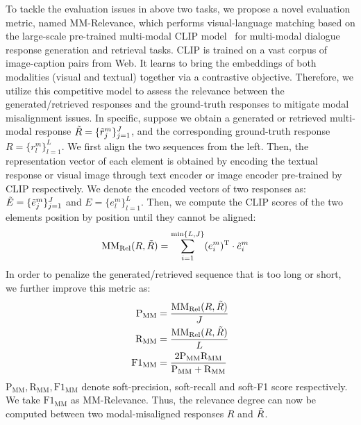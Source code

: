 \documentclass[11pt]{article}
\begin{document}
To tackle the evaluation issues in above two tasks, we propose a novel evaluation metric, named MM-Relevance, which performs visual-language matching based on the large-scale pre-trained multi-modal CLIP model~\cite{radford2021learning} for multi-modal dialogue response generation and retrieval tasks. CLIP is trained on a vast corpus of image-caption pairs from Web. It learns to bring the embeddings of both modalities (visual and textual) together via a contrastive objective. Therefore, we utilize this competitive model to assess the relevance between the generated/retrieved responses and the ground-truth responses to mitigate modal misalignment issues. In specific, suppose we obtain a generated or retrieved multi-modal response $\Tilde{R}=\{ \Tilde{r}^m_j\}_{j=1}^{J}$, and the corresponding ground-truth response $R = \{ r^m_l\}_{l=1}^{L}$. We first align the two sequences from the left. Then, the representation vector of each element is obtained by encoding the textual response or visual image through text encoder or image encoder pre-trained by CLIP respectively. We denote the encoded vectors of two responses as: $\Tilde{E}=\{ \Tilde{e}^m_j\}_{j=1}^{J}$ and $E=\{ e^m_l\}_{l=1}^{L}$. Then, we compute the CLIP scores of the two elements position by position until they cannot be aligned:
\begin{equation} 
\begin{aligned}
    \text{MM}_{\text{Rel}}(R, \Tilde{R}) &= \sum_{i=1}^{\min\{L, J \}}(e^m_i)^\text{T} \cdot \Tilde{e}^m_i
\end{aligned}
\end{equation}
In order to penalize the generated/retrieved sequence that is too long or short, we further improve this metric as:
\begin{equation}
\begin{aligned}
    \text{P}_{\text{MM}} &= \frac{\text{MM}_{\text{Rel}}(R, \Tilde{R})}{J} \\ 
    \text{R}_{\text{MM}} &= \frac{\text{MM}_{\text{Rel}}(R, \Tilde{R})}{L} \\
    \text{F1}_{\text{MM}} &= \frac{2\text{P}_{\text{MM}}\text{R}_{\text{MM}}}{\text{P}_{\text{MM}}+\text{R}_{\text{MM}}} \\
\end{aligned} 
\end{equation}
$\text{P}_{\text{MM}}, \text{R}_{\text{MM}}, \text{F1}_{\text{MM}}$ denote soft-precision, soft-recall and soft-F1 score respectively. We take $\text{F1}_{\text{MM}}$ as MM-Relevance. Thus, the relevance degree can now be computed between two modal-misaligned responses $R$ and $\Tilde{R}$. 
\end{document}
